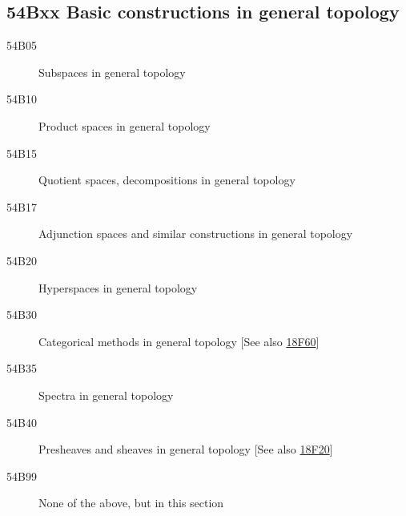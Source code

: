 \documentclass[letterpaper]{article}
\begin{document}
\subsection*{54Bxx  Basic constructions in general topology}\label{54Bxx}
\begin{description}  
\item [54B05]\label{54B05} Subspaces in general topology
\item [54B10]\label{54B10} Product spaces  in general topology
\item [54B15]\label{54B15} Quotient spaces, decompositions in general topology
\item [54B17]\label{54B17} Adjunction spaces and similar constructions in general topology
\item [54B20]\label{54B20} Hyperspaces in general topology
\item [54B30]\label{54B30} Categorical methods in general topology [See also \hyperref[18F60]{18F60}]
\item [54B35]\label{54B35} Spectra in general topology
\item [54B40]\label{54B40} Presheaves and sheaves in general topology [See also \hyperref[18F20]{18F20}]
\item [54B99]\label{54B99} None of the above, but in this section
\end{description}
\end{document}
